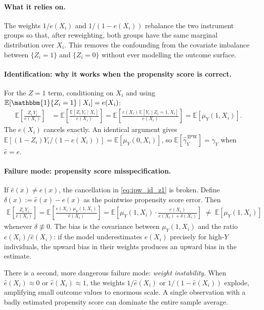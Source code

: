 \documentclass[12pt,a4paper]{article}
\theoremstyle{remark}
\newcommand{\E}{\mathbb{E}}
\newcommand{\ind}{\mathbbm{1}}
\newcommand{\muY}{\mu_Y}
\newcommand{\ehat}{\hat{e}}
\begin{document}
\paragraph{What it relies on.}
The weights $1/e(X_i)$ and $1/(1-e(X_i))$ rebalance the two instrument groups so
that, after reweighting, both groups have the same marginal distribution over $X_i$.
This removes the confounding from the covariate imbalance between $\{Z_i=1\}$ and
$\{Z_i=0\}$ without ever modelling the outcome surface.

\paragraph{Identification: why it works when the propensity score is correct.}
For the $Z=1$ term, conditioning on $X_i$ and using
$\E[\ind\{Z_i=1\} \mid X_i] = e(X_i)$:
\begin{align}
  \E\!\left[\frac{Z_i\, Y_i}{e(X_i)}\right]
  &= \E\!\left[\frac{\E[Z_i\, Y_i \mid X_i]}{e(X_i)}\right]
  = \E\!\left[\frac{e(X_i)\,\E[Y_i \mid Z_i=1, X_i]}{e(X_i)}\right]
  = \E[\muY(1, X_i)].
  \label{eq:ipw_id_z1}
\end{align}
The $e(X_i)$ cancels exactly. An identical argument gives
$\E[(1-Z_i)Y_i/(1-e(X_i))] = \E[\muY(0,X_i)]$, so
$\E[\hat{\gamma}_Y^{\,\mathrm{IPW}}] = \gamma_Y$ when $\ehat = e$.

\paragraph{Failure mode: propensity score misspecification.}
If $\ehat(x) \neq e(x)$, the cancellation in \eqref{eq:ipw_id_z1} is broken. Define
$\delta(x) := \ehat(x) - e(x)$ as the pointwise propensity score error. Then
\begin{align}
  \E\!\left[\frac{Z_i\, Y_i}{\ehat(X_i)}\right]
  = \E\!\left[\frac{e(X_i)\,\muY(1, X_i)}{\ehat(X_i)}\right]
  = \E\!\left[\muY(1,X_i)\cdot\frac{e(X_i)}{e(X_i)+\delta(X_i)}\right]
  \;\neq\; \E[\muY(1,X_i)]
  \label{eq:ipw_bias}
\end{align}
whenever $\delta \not\equiv 0$. The bias is the covariance between $\muY(1,X_i)$ and
the ratio $e(X_i)/\ehat(X_i)$: if the model underestimates $e(X_i)$ precisely for
high-$Y$ individuals, the upward bias in their weights produces an upward bias in the
estimate.

There is a second, more dangerous failure mode: \emph{weight instability}. When
$\ehat(X_i) \approx 0$ or $\ehat(X_i) \approx 1$, the weights
$1/\ehat(X_i)$ or $1/(1-\ehat(X_i))$ explode, amplifying small outcome values
to enormous scale. A single observation with a badly estimated propensity score can
dominate the entire sample average.
\end{document}
